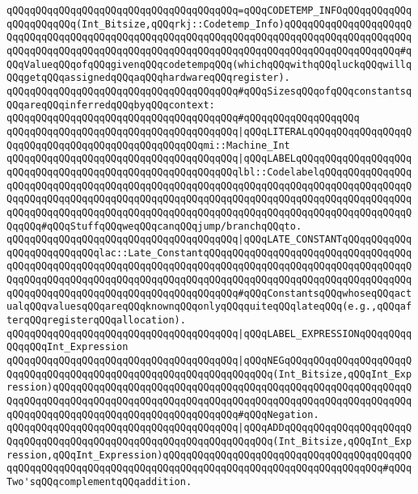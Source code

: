 \verb|qQQqqQQqqQQqqQQqqQQqqQQqqQQqqQQqqQQqqQQq=qQQqCODETEMP_INFOqQQqqQQqqQQqqQQqqQQqqQQq(Int_Bitsize,qQQqrkj::Codetemp_Info)qQQqqQQqqQQqqQQqqQQqqQQqqQQqqQQqqQQqqQQqqQQqqQQqqQQqqQQqqQQqqQQqqQQqqQQqqQQqqQQqqQQqqQQqqQQqqQQqqQQqqQQqqQQqqQQqqQQqqQQqqQQqqQQqqQQqqQQqqQQqqQQqqQQqqQQqqQQqqQQq#qQQqValueqQQqofqQQqgivenqQQqcodetempqQQq(whichqQQqwithqQQqluckqQQqwillqQQqgetqQQqassignedqQQqaqQQqhardwareqQQqregister).|\newline
\newline
\verb|qQQqqQQqqQQqqQQqqQQqqQQqqQQqqQQqqQQqqQQq#qQQqSizesqQQqofqQQqconstantsqQQqareqQQqinferredqQQqbyqQQqcontext:|\newline
\verb|qQQqqQQqqQQqqQQqqQQqqQQqqQQqqQQqqQQqqQQq#qQQqqQQqqQQqqQQqqQQq|\newline
\verb|qQQqqQQqqQQqqQQqqQQqqQQqqQQqqQQqqQQqqQQq|\verb#|qQQqLITERALqQQqqQQqqQQqqQQqqQQqqQQqqQQqqQQqqQQqqQQqqQQqqQQqqQQqmi::Machine_Int#\newline
\verb|qQQqqQQqqQQqqQQqqQQqqQQqqQQqqQQqqQQqqQQq|\verb#|qQQqLABELqQQqqQQqqQQqqQQqqQQqqQQqqQQqqQQqqQQqqQQqqQQqqQQqqQQqqQQqqQQqlbl::CodelabelqQQqqQQqqQQqqQQqqQQqqQQqqQQqqQQqqQQqqQQqqQQqqQQqqQQqqQQqqQQqqQQqqQQqqQQqqQQqqQQqqQQqqQQqqQQqqQQqqQQqqQQqqQQqqQQqqQQqqQQqqQQqqQQqqQQqqQQqqQQqqQQqqQQqqQQqqQQqqQQqqQQqqQQqqQQqqQQqqQQqqQQqqQQqqQQqqQQqqQQqqQQqqQQqqQQqqQQqqQQqqQQqqQQqqQQq#\verb|#qQQqStuffqQQqweqQQqcanqQQqjump/branchqQQqto.|\newline
\verb|qQQqqQQqqQQqqQQqqQQqqQQqqQQqqQQqqQQqqQQq|\verb#|qQQqLATE_CONSTANTqQQqqQQqqQQqqQQqqQQqqQQqqQQqlac::Late_ConstantqQQqqQQqqQQqqQQqqQQqqQQqqQQqqQQqqQQqqQQqqQQqqQQqqQQqqQQqqQQqqQQqqQQqqQQqqQQqqQQqqQQqqQQqqQQqqQQqqQQqqQQqqQQqqQQqqQQqqQQqqQQqqQQqqQQqqQQqqQQqqQQqqQQqqQQqqQQqqQQqqQQqqQQqqQQqqQQqqQQqqQQqqQQqqQQqqQQqqQQqqQQqqQQqqQQqqQQq#\verb|#qQQqConstantsqQQqwhoseqQQqactualqQQqvaluesqQQqareqQQqknownqQQqonlyqQQqquiteqQQqlateqQQq(e.g.,qQQqafterqQQqregisterqQQqallocation).|\newline
\verb|qQQqqQQqqQQqqQQqqQQqqQQqqQQqqQQqqQQqqQQq|\verb#|qQQqLABEL_EXPRESSIONqQQqqQQqqQQqqQQqInt_Expression#\newline
\newline
\verb|qQQqqQQqqQQqqQQqqQQqqQQqqQQqqQQqqQQqqQQq|\verb#|qQQqNEGqQQqqQQqqQQqqQQqqQQqqQQqqQQqqQQqqQQqqQQqqQQqqQQqqQQqqQQqqQQqqQQqqQQq(Int_Bitsize,qQQqInt_Expression)qQQqqQQqqQQqqQQqqQQqqQQqqQQqqQQqqQQqqQQqqQQqqQQqqQQqqQQqqQQqqQQqqQQqqQQqqQQqqQQqqQQqqQQqqQQqqQQqqQQqqQQqqQQqqQQqqQQqqQQqqQQqqQQqqQQqqQQqqQQqqQQqqQQqqQQqqQQqqQQqqQQqqQQqqQQq#\verb|#qQQqNegation.|\newline
\verb|qQQqqQQqqQQqqQQqqQQqqQQqqQQqqQQqqQQqqQQq|\verb#|qQQqADDqQQqqQQqqQQqqQQqqQQqqQQqqQQqqQQqqQQqqQQqqQQqqQQqqQQqqQQqqQQqqQQqqQQq(Int_Bitsize,qQQqInt_Expression,qQQqInt_Expression)qQQqqQQqqQQqqQQqqQQqqQQqqQQqqQQqqQQqqQQqqQQqqQQqqQQqqQQqqQQqqQQqqQQqqQQqqQQqqQQqqQQqqQQqqQQqqQQqqQQqqQQqqQQq#\verb|#qQQqTwo'sqQQqcomplementqQQqaddition.|\newline
